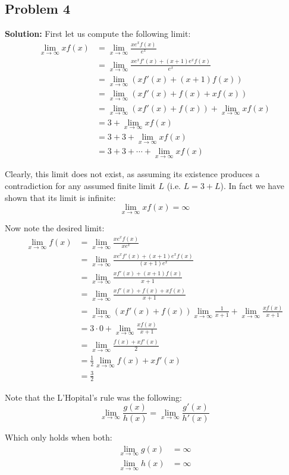 \documentclass{article}
\begin{document}
\subsection*{Problem 4}
\noindent\textbf{Solution:} First let us compute the following limit:
\begin{align*}
  \lim_{x\to\infty}xf(x)&=\lim_{x\to\infty}\frac{xe^xf(x)}{e^x}\\
  &=\lim_{x\to\infty}\frac{xe^xf'(x)+(x+1)e^xf(x)}{e^x}\tag{L'Hopitals Rule}\\
  &=\lim_{x\to\infty}\left(xf'(x)+(x+1)f(x)\right)\\
  &=\lim_{x\to\infty}\left(xf'(x)+f(x)+xf(x)\right)\\
  &=\lim_{x\to\infty}\left(xf'(x)+f(x)\right)+\lim_{x\to\infty}xf(x)\\
  &=3+\lim_{x\to\infty}xf(x)\\
  &=3+3+\lim_{x\to\infty}xf(x)\\
  &=3+3+\cdots+\lim_{x\to\infty}xf(x)
\end{align*}

Clearly, this limit does not exist, as assuming its existence produces a contradiction for any assumed finite limit $L$ (i.e. $L=3+L$). In fact we have shown that its limit is infinite:
$$\lim_{x\to\infty}xf(x)=\infty$$

Now note the desired limit:
\begin{align*}
  \lim_{x\to\infty}f(x)&=\lim_{x\to\infty}\frac{xe^xf(x)}{xe^x}\\
  &=\lim_{x\to\infty}\frac{xe^xf'(x)+(x+1)e^xf(x)}{(x+1)e^x}\tag{L'Hopitals Rule}\\
  &=\lim_{x\to\infty}\frac{xf'(x)+(x+1)f(x)}{x+1}\\
  &=\lim_{x\to\infty}\frac{xf'(x)+f(x)+xf(x)}{x+1}\\
  &=\lim_{x\to\infty}\left(xf'(x)+f(x)\right)\lim_{x\to\infty}\frac{1}{x+1}+\lim_{x\to\infty}\frac{xf(x)}{x+1}\\
  &=3\cdot0+\lim_{x\to\infty}\frac{xf(x)}{x+1}\\
  &=\lim_{x\to\infty}\frac{f(x)+xf'(x)}{2}\tag{L'Hopitals Rule}\\
  &=\frac{1}{2}\lim_{x\to\infty}f(x)+xf'(x)\\
  &=\frac{3}{2}
\end{align*}

Note that the L'Hopital's rule was the following:
$$\lim_{x\to\infty}\frac{g(x)}{h(x)}=\lim_{x\to\infty}\frac{g'(x)}{h'(x)}$$

Which only holds when both:
\begin{align*}
  \lim_{x\to\infty}g(x)&=\infty\\
  \lim_{x\to\infty}h(x)&=\infty
\end{align*}
\end{document}
